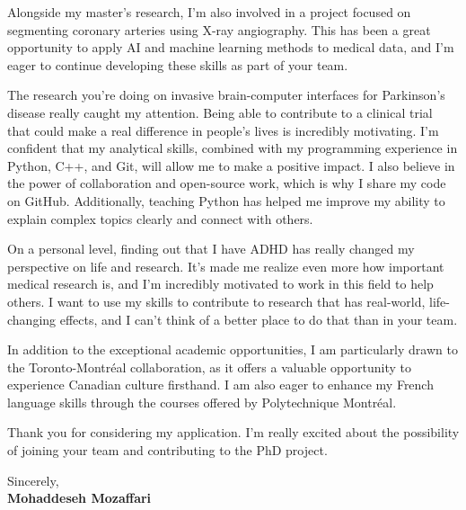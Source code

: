 \documentclass[letterpaper,11pt]{letter}
\begin{document}
Alongside my master’s research, I’m also involved in a project focused on segmenting coronary arteries using X-ray angiography. This has been a great opportunity to apply AI and machine learning methods to medical data, and I’m eager to continue developing these skills as part of your team.


The research you’re doing on invasive brain-computer interfaces for Parkinson’s disease really caught my attention. Being able to contribute to a clinical trial that could make a real difference in people’s lives is incredibly motivating. I’m confident that my analytical skills, combined with my programming experience in Python, C++, and Git, will allow me to make a positive impact. I also believe in the power of collaboration and open-source work, which is why I share my code on GitHub. Additionally, teaching Python has helped me improve my ability to explain complex topics clearly and connect with others.

On a personal level, finding out that I have ADHD has really changed my perspective on life and research. It’s made me realize even more how important medical research is, and I’m incredibly motivated to work in this field to help others. I want to use my skills to contribute to research that has real-world, life-changing effects, and I can’t think of a better place to do that than in your team.

In addition to the exceptional academic opportunities, I am particularly drawn to the Toronto-Montréal collaboration, as it offers a valuable opportunity to experience Canadian culture firsthand. I am also eager to enhance my French language skills through the courses offered by Polytechnique Montréal.

Thank you for considering my application. I’m really excited about the possibility of joining your team and contributing to the PhD project.


\begin{flushleft}
    Sincerely, \\
    \textbf{Mohaddeseh Mozaffari}
\end{flushleft}
\end{document}

